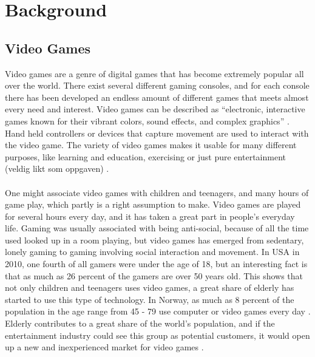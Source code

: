\chapter{Background}
\section{Video Games}
Video games are a genre of digital games that has become extremely popular all over the world. There exist several different gaming consoles, and for each console there has been developed an endless amount of different games that meets almost every need and interest. Video games can be described as “electronic, interactive games known for their vibrant colors, sound effects, and complex graphics” \cite{videogamedef}. Hand held controllers or devices that capture movement are used to interact with the video game. The variety of video games makes it usable for many different purposes, like learning and education, exercising or just pure entertainment (veldig likt som oppgaven) \cite{project}. \\ \\
One might associate video games with children and teenagers, and many hours of game play, which partly is a right assumption to make. Video games are played for several hours every day, and it has taken a great part in people's everyday life. Gaming was usually associated with being anti-social, because of all the time used looked up in a room playing, but video games has emerged from sedentary, lonely gaming to gaming involving social interaction and movement. In USA in 2010, one fourth of all gamers were under the age of 18, but an interesting fact is that as much as 26 percent of the gamers are over 50 years old. This shows that not only children and teenagers uses video games, a great share of elderly has started to use this type of technology. In Norway,  as much as 8 percent of the population in the age range from 45 - 79 use computer or video games every day \cite{project}. Elderly contributes to a great share of the world's population, and if the entertainment industry could see this group as potential customers, it would open up a new and inexperienced market for video games \cite{ijsselsteijn2007digital}. 
